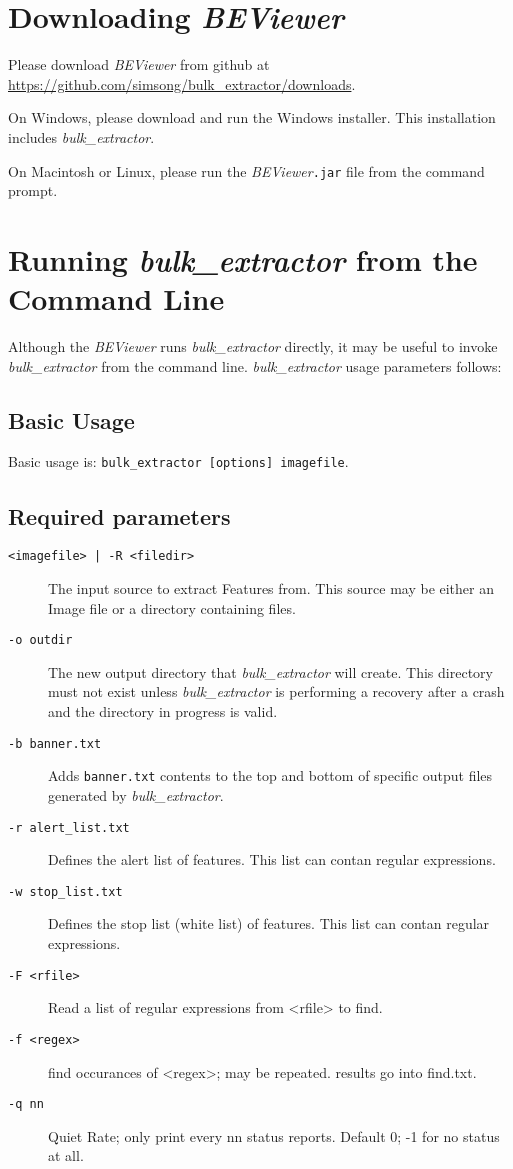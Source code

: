 \documentclass[10pt,twoside]{article}
\newcommand{\bulk}{\emph{bulk\_extractor}\xspace}
\newcommand{\bev}{\emph{BEViewer}\xspace}
\begin{document}
\section{Downloading \bev}
Please download \bev from github at \url{https://github.com/simsong/bulk_extractor/downloads}.

\begin{compactitem}
\item On Windows, please download and run the Windows installer.
This installation includes \bulk.
\item On Macintosh or Linux, please run the \bev \texttt{.jar} file from the command prompt.
\end{compactitem}

\section {Running \bulk from the Command Line}
Although the \bev runs \bulk directly,
it may be useful to invoke \bulk from the command line.
\bulk usage parameters follows:

\subsection*{Basic Usage}
Basic usage is: \texttt{bulk\_extractor [options] imagefile}.

\subsection*{Required parameters}
\begin{description}
\item [\texttt{<imagefile> | -R <filedir>}]
The input source to extract \glspl{Feature} from.
This source may be either an \gls{Image} file
or a directory containing files.
\item [\texttt{-o outdir}] The new output directory that \bulk will create.
This directory must not exist unless \bulk is performing a recovery after a crash
and the directory in progress is valid.
\item[\texttt{-b banner.txt}] Adds \texttt{banner.txt} contents to the top and bottom of specific
output files generated by \bulk.
\item[\texttt{-r alert\_list.txt}] Defines the alert list of features.
This list can contan regular expressions.
\item[\texttt{-w stop\_list.txt}] Defines the stop list (white list) of features.
This list can contan regular expressions.
\item[\texttt{-F <rfile>}] Read a list of regular expressions from <rfile> to find.
\item[\texttt{-f <regex>}] find occurances of <regex>; may be repeated.
                  results go into find.txt.
\item[\texttt{-q nn}] Quiet Rate; only print every nn status reports. Default 0;
                 -1 for no status at all.
\end{description}
\end{document}

